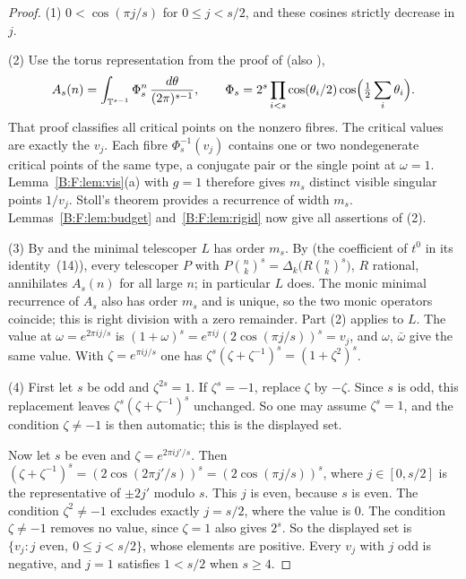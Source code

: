 \documentclass[11pt,a4paper]{article}
\theoremstyle{definition}
\theoremstyle{remark}
\numberwithin{equation}{section}
\begin{document}
\begin{proof}
(1) $0<\cos(\pi j/s)$ for $0\le j<s/2$, and these cosines strictly decrease
in $j$.

(2) Use the torus representation from the proof of
\cite[Theorem~2.3]{R021} (also \cite{R019}),
\[
 A_s(n)=\int_{\mathbb T^{s-1}}\Phi_s^n\,\frac{d\theta}{(2\pi)^{s-1}},\qquad
 \Phi_s=2^s\prod_{i<s}\cos(\theta_i/2)\cos\Bigl(\tfrac12\sum_i\theta_i\Bigr).
\]
That proof classifies all critical points on the nonzero fibres. The
critical values are exactly the $v_j$. Each fibre $\Phi_s^{-1}(v_j)$
contains one or two nondegenerate critical points of the same type, a
conjugate pair or the single point at $\omega=1$. Lemma~\ref{B:F:lem:vis}(a)
with $g=1$ therefore gives $m_s$ distinct visible singular points $1/v_j$.
Stoll's theorem \cite{R001} provides a recurrence of width $m_s$.
Lemmas~\ref{B:F:lem:budget} and~\ref{B:F:lem:rigid} now give all assertions of
(2).

(3) By \cite[Remark~6]{R055} and \cite[Theorem~1.1]{R002} the minimal
telescoper $L$ has order $m_s$. By \cite[Theorem~2.1]{R002} (the coefficient
of $t^0$ in its identity~(14)), every telescoper $P$ with
$P\binom nk^s=\Delta_k\bigl(R\binom nk^s\bigr)$, $R$ rational, annihilates
$A_s(n)$ for all large $n$; in particular $L$ does. The monic minimal recurrence of $A_s$ also has order $m_s$
and is unique, so the two monic operators coincide; this is right division
with a zero remainder. Part (2) applies to $L$. The value at
$\omega=e^{2\pi ij/s}$ is $(1+\omega)^s=e^{\pi ij}(2\cos(\pi j/s))^s=v_j$,
and $\omega$, $\bar\omega$ give the same value. With $\zeta=e^{\pi ij/s}$ one
has $\zeta^s(\zeta+\zeta^{-1})^s=(1+\zeta^2)^s$.

(4) First let $s$ be odd and $\zeta^{2s}=1$. If $\zeta^s=-1$, replace $\zeta$
by $-\zeta$. Since $s$ is odd, this replacement leaves
$\zeta^s(\zeta+\zeta^{-1})^s$ unchanged. So one may assume $\zeta^s=1$, and
the condition $\zeta\ne-1$ is then automatic; this is the displayed set.

Now let $s$ be even and $\zeta=e^{2\pi ij'/s}$. Then
$(\zeta+\zeta^{-1})^s=(2\cos(2\pi j'/s))^s=(2\cos(\pi j/s))^s$, where
$j\in[0,s/2]$ is the representative of $\pm2j'$ modulo $s$. This $j$ is
even, because $s$ is even. The condition $\zeta^2\ne-1$ excludes exactly
$j=s/2$, where the value is $0$. The condition $\zeta\ne-1$ removes no value,
since $\zeta=1$ also gives $2^s$. So the displayed set is
$\{v_j:j\text{ even},\ 0\le j<s/2\}$, whose elements are positive. Every
$v_j$ with $j$ odd is negative, and $j=1$ satisfies $1<s/2$ when $s\ge4$.
\end{proof}
\end{document}
